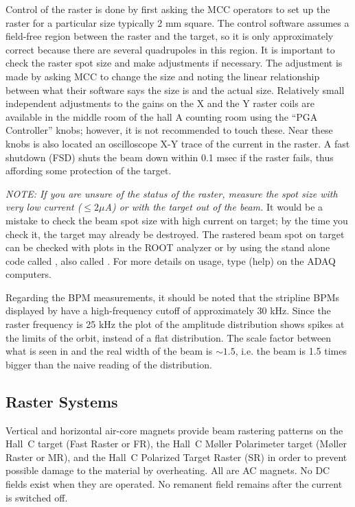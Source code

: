 {Control of the raster is done by first asking the MCC
operators to set up the raster for a particular size
typically 2 mm square.
The control software assumes a field-free region between
the raster and the target, so it is only approximately
correct because there are several quadrupoles in this region.
It is important to check the raster spot size and
make adjustments if necessary.  The adjustment is made
by asking MCC to change the size and noting the 
linear relationship between what their software says
the size is and the actual size.
Relatively small independent adjustments to the 
gains on the X and the Y raster
coils are available in the middle room of the hall A
counting room using the ``PGA Controller'' knobs;
however, it is not recommended to touch these.
Near these knobs is also located an oscilloscope X-Y trace
of the current in the raster.  A fast shutdown (FSD) shuts
the beam down within 0.1 msec if the raster fails, thus
affording some protection of the target.

{\it NOTE:  If you are unsure of the status of the raster,
measure the spot size with very low current ($\le 2 \mu$A) or with
the target out of the beam.}  It would be a mistake
to check the beam spot size with high current on target; by
the time you check it, the target may already be destroyed.
The rastered beam spot on target can be checked with
plots in the ROOT analyzer or by 
using the stand alone code called ,
also called .
For more details on usage, type  (help)
on the ADAQ computers.

Regarding the BPM measurements, it should be noted that 
the stripline BPMs displayed by  have a high-frequency 
cutoff of approximately 30 kHz.  Since the raster frequency is 25 kHz
the plot of the amplitude distribution shows spikes at the 
limits of the orbit, instead of a flat distribution.  The scale
factor between what is seen in  and the real width of the beam
is $\sim 1.5$, i.e. the beam is 1.5 times bigger than the naive
reading of the  distribution.
}


\subsection{Raster Systems}

Vertical and horizontal air-core magnets provide beam
rastering patterns on the Hall~C target (Fast Raster or FR), the
Hall~C M\o ller Polarimeter target (M\o ller Raster or MR), and the Hall~C 
Polarized Target Raster (SR) in order to prevent possible damage to the material by
overheating. All are AC magnets. No DC fields 
exist when they are operated. No remanent field remains after
the current is switched off.

